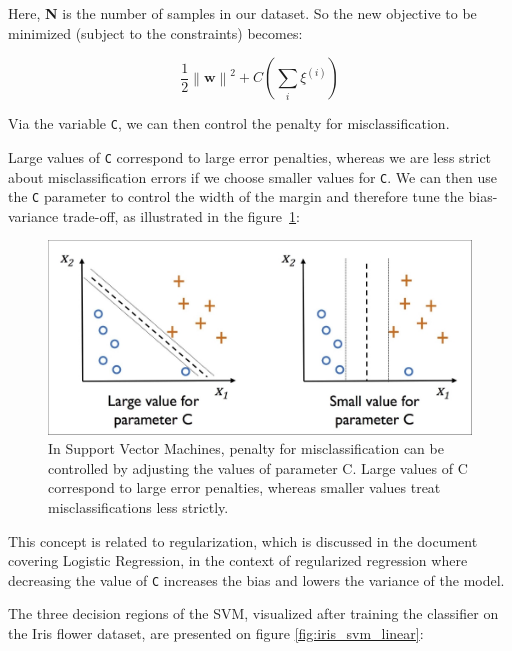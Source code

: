 \documentclass[11pt]{article}
\newcommand{\norm}[1]{\left\lVert#1\right\rVert}
\newcommand{\vect}[1]{\boldsymbol{#1}}
\begin{document}
    Here, \textbf{N} is the number of samples in our dataset.
    So the new objective to be minimized (subject to the constraints) becomes:

    \begin{equation}
        \label{eq:svm_margin_reciprocal_slack}
        \frac{1} {2} \norm{\vect{w}}^2 + C \left( \sum \limits_i \xi^{(i)} \right)
    \end{equation}

    Via the variable \texttt{C}, we can then control the penalty for misclassification.

    Large values of \texttt{C} correspond to large error penalties, whereas we are less strict about
    misclassification errors if we choose smaller values for \texttt{C}.
    We can then use the \texttt{C} parameter to control the width of the margin and therefore tune the
    bias-variance trade-off, as illustrated in the figure~\ref{fig:svm_c}:

    \begin{figure}[hbt!]
        \centering
        \includegraphics[width=1\linewidth,trim=4 4 4 4,clip]{img/svm_c.jpg}
        \caption{In Support Vector Machines, penalty for misclassification can be controlled by adjusting the values
        of parameter C. Large values of C correspond to large error penalties, whereas smaller values treat
        misclassifications less strictly.}
        \label{fig:svm_c}
    \end{figure}

    This concept is related to regularization, which is discussed in the document covering Logistic Regression,
    in the context of regularized regression where decreasing the value of \texttt{C} increases the bias and lowers the
    variance of the model.

    The three decision regions of the SVM, visualized after training the classifier on the Iris flower dataset, are presented on figure \ref{fig:iris_svm_linear}:
\end{document}
